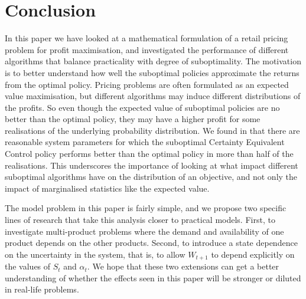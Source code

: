 \documentclass[main.tex]{subfiles}
\begin{document}
\listoftodos

\section{Conclusion}\label{sec:conclusion}
In this paper we have looked at a mathematical formulation of a
retail pricing problem for profit maximisation, and investigated the
performance of different algorithms that balance practicality
with degree of suboptimality. The motivation is to better understand
how well the suboptimal policies approximate the returns from the
optimal policy.
Pricing problems are often formulated as an expected value
maximisation, but different algorithms may induce different
distributions of the profits.
So even though the expected value of suboptimal policies are no better
than the optimal policy, they may have a higher profit for some
realisations of the underlying probability distribution.
We found in  that there are
reasonable system parameters for which
the suboptimal Certainty Equivalent Control policy performs better
than the optimal policy in more
than half of the realisations.
This underscores the importance of looking at what impact
different suboptimal algorithms have on the distribution of
an objective, and not only the impact of
marginalised statistics like the expected value.

The model problem in this paper is fairly simple, and
we propose two specific lines of research that
take this analysis closer to practical models.
First, to investigate multi-product problems where the demand and
availability of one product depends on the other products.
Second, to introduce a state dependence on the uncertainty in the
system, that is, to allow $W_{t+1}$ to depend explicitly on the values
of $S_t$ and $\alpha_t$.
We hope that these two extensions can get a better understanding of
whether the effects seen in this paper will be stronger or diluted
in real-life problems.

\biblio
\end{document}
